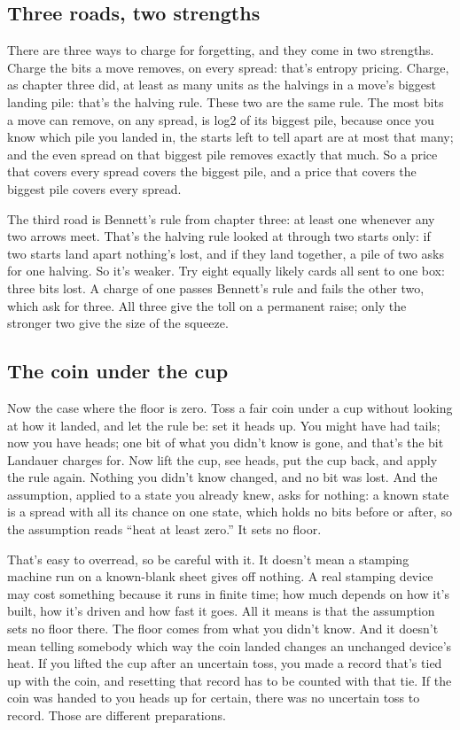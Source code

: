 \documentclass[11pt,twoside]{article}
\theoremstyle{thielethm}
\theoremstyle{thieledef}
\theoremstyle{thieledef}
\theoremstyle{thieledef}
\theoremstyle{thielethm}
\theoremstyle{thieleobs}
\theoremstyle{thielethm}
\begin{document}
\subsection{Three roads, two strengths}

There are three ways to charge for forgetting, and they come in two strengths. Charge the bits a move removes, on every spread: that's entropy pricing. Charge, as chapter three did, at least as many units as the halvings in a move's biggest landing pile: that's the halving rule. These two are the same rule. The most bits a move can remove, on any spread, is log2 of its biggest pile, because once you know which pile you landed in, the starts left to tell apart are at most that many; and the even spread on that biggest pile removes exactly that much. So a price that covers every spread covers the biggest pile, and a price that covers the biggest pile covers every spread.

The third road is Bennett's rule from chapter three: at least one whenever any two arrows meet. That's the halving rule looked at through two starts only: if two starts land apart nothing's lost, and if they land together, a pile of two asks for one halving. So it's weaker. Try eight equally likely cards all sent to one box: three bits lost. A charge of one passes Bennett's rule and fails the other two, which ask for three. All three give the toll on a permanent raise; only the stronger two give the size of the squeeze.

\subsection{The coin under the cup}

Now the case where the floor is zero. Toss a fair coin under a cup without looking at how it landed, and let the rule be: set it heads up. You might have had tails; now you have heads; one bit of what you didn't know is gone, and that's the bit Landauer charges for. Now lift the cup, see heads, put the cup back, and apply the rule again. Nothing you didn't know changed, and no bit was lost. And the assumption, applied to a state you already knew, asks for nothing: a known state is a spread with all its chance on one state, which holds no bits before or after, so the assumption reads ``heat at least zero.'' It sets no floor.

That's easy to overread, so be careful with it. It doesn't mean a stamping machine run on a known-blank sheet gives off nothing. A real stamping device may cost something because it runs in finite time; how much depends on how it's built, how it's driven and how fast it goes. All it means is that the assumption sets no floor there. The floor comes from what you didn't know. And it doesn't mean telling somebody which way the coin landed changes an unchanged device's heat. If you lifted the cup after an uncertain toss, you made a record that's tied up with the coin, and resetting that record has to be counted with that tie. If the coin was handed to you heads up for certain, there was no uncertain toss to record. Those are different preparations.
\end{document}
